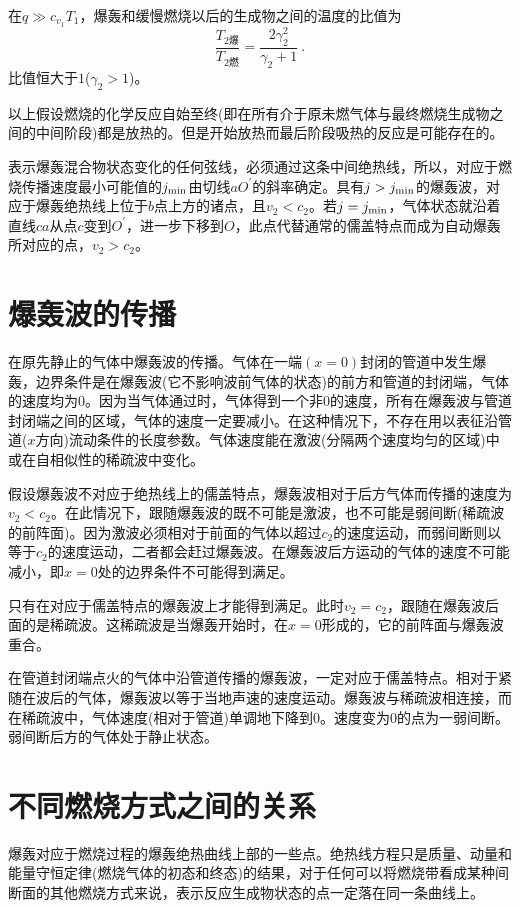 \documentclass[12pt,a4paper]{article}
\begin{document}
在$q \gg c_{v_1}T_1$，爆轰和缓慢燃烧以后的生成物之间的温度的比值为
\begin{equation}
\dfrac{T_{2 \text{爆} }}{T_{2 \text{燃} }} = \dfrac{2\gamma_2^2}{\gamma_2 +1} ~.
\end{equation}
比值恒大于$1$($\gamma_2 > 1$)。

以上假设燃烧的化学反应自始至终(即在所有介于原未燃气体与最终燃烧生成物之间的中间阶段)都是放热的。但是开始放热而最后阶段吸热的反应是可能存在的。



表示爆轰混合物状态变化的任何弦线，必须通过这条中间绝热线，所以，对应于燃烧传播速度最小可能值的$j_{\rm min}$由切线$aO^\prime$的斜率确定。具有$j>j_{\rm min}$的爆轰波，对应于爆轰绝热线上位于$b$点上方的诸点，且$v_2 < c_2$。若$j = j_{\rm min}$，气体状态就沿着直线$ca$从点$c$变到$O^\prime$，进一步下移到$O$，此点代替通常的儒盖特点而成为自动爆轰所对应的点，$v_2 > c_2$。



\section{爆轰波的传播}
在原先静止的气体中爆轰波的传播。气体在一端$(x = 0)$封闭的管道中发生爆轰，边界条件是在爆轰波(它不影响波前气体的状态)的前方和管道的封闭端，气体的速度均为$0$。因为当气体通过时，气体得到一个非$0$的速度，所有在爆轰波与管道封闭端之间的区域，气体的速度一定要减小。在这种情况下，不存在用以表征沿管道($x$方向)流动条件的长度参数。气体速度能在激波(分隔两个速度均匀的区域)中或在自相似性的稀疏波中变化。

假设爆轰波不对应于绝热线上的儒盖特点，爆轰波相对于后方气体而传播的速度为$v_2 < c_2$。在此情况下，跟随爆轰波的既不可能是激波，也不可能是弱间断(稀疏波的前阵面)。因为激波必须相对于前面的气体以超过$c_2$的速度运动，而弱间断则以等于$c_2$的速度运动，二者都会赶过爆轰波。在爆轰波后方运动的气体的速度不可能减小，即$x = 0$处的边界条件不可能得到满足。

只有在对应于儒盖特点的爆轰波上才能得到满足。此时$v_2 = c_2$，跟随在爆轰波后面的是稀疏波。这稀疏波是当爆轰开始时，在$x = 0$形成的，它的前阵面与爆轰波重合。

在管道封闭端点火的气体中沿管道传播的爆轰波，一定对应于儒盖特点。相对于紧随在波后的气体，爆轰波以等于当地声速的速度运动。爆轰波与稀疏波相连接，而在稀疏波中，气体速度(相对于管道)单调地下降到$0$。速度变为$0$的点为一弱间断。弱间断后方的气体处于静止状态。




\section{不同燃烧方式之间的关系}
爆轰对应于燃烧过程的爆轰绝热曲线上部的一些点。绝热线方程只是质量、动量和能量守恒定律(燃烧气体的初态和终态)的结果，对于任何可以将燃烧带看成某种间断面的其他燃烧方式来说，表示反应生成物状态的点一定落在同一条曲线上。
\end{document}
